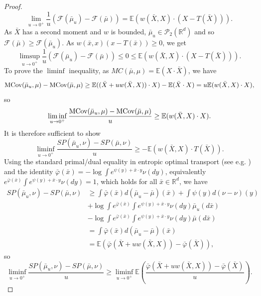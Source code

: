 \documentclass[reqno, a4paper]{amsart}
\theoremstyle{plain}
\theoremstyle{definition}
\theoremstyle{remark}
\numberwithin{equation}{section}
\numberwithin{theorem}{section}
\newcommand{\R}{\mathbb{R}}
\newcommand{\E}{\mathbb{E}}
\newcommand{\MCov}{\textnormal{MCov}}
\newcommand{\PP}{\mathcal{P}}
\begin{document}
\begin{proof}
\begin{equation}
			\lim_{u \to 0^+} \frac1u(\mathcal{F}(\bar\mu_u)- \mathcal{F}(\bar \mu) )= \E\left(w(\bar X,X)\cdot (X - T(\bar X))\right).
		\end{equation}
		As $\bar X $ has a second moment and $w$ is bounded, $\bar\mu_u \in \PP_2(\R^d)$ and so $\mathcal{F}(\bar \mu) \geq \mathcal{F}(\bar \mu_u)$. As $w(\bar x, x)(x-T(\bar x)) \geq 0$, we get 
		\begin{equation*}
			\limsup_{u \to 0^+} \frac1u(\mathcal{F}(\bar\mu_u)- \mathcal{F}(\bar \mu) ) \leq 0 \leq \E(w(\bar X, X)\cdot (X-T(\bar X))).
		\end{equation*}
		To prove the $\liminf$ inequality, as $MC(\bar \mu, \mu) = \E(X\cdot \bar X)$, we have
		\begin{equation*}
			\MCov(\bar \mu_u,\mu)- \MCov(\bar \mu,\mu) \geq \E((\bar X + u w(\bar X, X))\cdot X) - \E(\bar X \cdot X) = u\E(w(\bar X,X)\cdot X),
		\end{equation*}
		so
		\begin{equation*}
			\liminf_{u \to 0^+} \frac{\MCov(\bar \mu_u,\mu)-\MCov(\bar \mu,\mu)}{u} \geq \E(w(\bar X,X)\cdot X).
		\end{equation*}
		It is therefore sufficient to show  $$\liminf_{u \to 0^+}  \frac{SP(\bar \mu_u,\nu)-SP(\bar \mu,\nu)}{u} \geq -\E(w(\bar X,X)\cdot T(\bar X)).$$  Using the standard primal/dual equality in entropic optimal transport (see e.g. \cite[Theorem 4.7]{Nu22}) and the identity $\bar\varphi(\bar x)=-\log\int e^{\psi(y) + \bar x \cdot y} \nu(dy)$, equivalently $e^{\bar\varphi(\bar x)}\int e^{\psi(y) + \bar x \cdot y}\nu(dy)=1$, which holds for all $\bar x \in \R^d$, we have
		\begin{align*}
			SP(\bar \mu_u,\nu)- SP(\bar \mu,\nu) &\geq \int \bar\varphi(\bar x) d (\bar \mu_u - \bar \mu)(\bar x) + \int \psi(y) d (\nu - \nu)(y) \\
			&+  \log \int e^{\bar\varphi(\bar x)}\int  e^{ \psi(y) + \bar x \cdot y} \nu(dy) \bar\mu_u(d\bar x) \\
			&- \log \int e^{\bar\varphi(\bar x)}\int  e^{   \psi(y) + \bar x \cdot y} \nu(dy) \bar\mu(d\bar x)\\
			&= \int \bar\varphi(\bar x) d (\bar \mu_u - \bar \mu)(\bar x)\\
			&= \E(\bar\varphi(\bar X+uw(\bar X,X))-\bar\varphi(\bar X)),
		\end{align*}
		so
		\begin{equation*}
			\liminf_{u \to 0^+} \frac{SP(\bar \mu_u,\nu)- SP(\bar \mu,\nu)}{u} \geq \liminf_{u\to 0^+} \E\left( \frac{\bar\varphi(\bar X+uw(\bar X,X))-\bar\varphi(\bar X)}{u}\right).

\end{equation*}
\end{proof}
\end{document}
